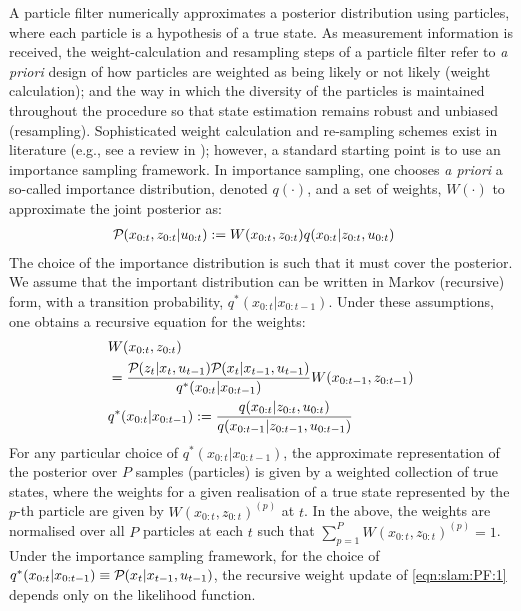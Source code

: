 A particle filter numerically approximates a posterior distribution using particles, where each particle is a hypothesis of a true state. As measurement information is received, the weight-calculation and resampling steps of a particle filter refer to \textit{a priori} design of how particles are weighted as being likely or not likely (weight calculation); and the way in which the diversity of the particles is maintained throughout the procedure so that state estimation remains robust and unbiased (resampling). Sophisticated weight calculation and re-sampling schemes exist in literature (e.g., see a review in \cite{li2015resampling}); however, a standard starting point is to use an importance sampling framework. In importance sampling, one chooses \textit{a priori} a so-called importance distribution, denoted $q(\cdot)$, and a set of weights, $W(\cdot)$ to approximate the joint posterior as:
\begin{align}
\mathcal{P}_{} ( x_{0:t} , z_{0:t} |u_{0:t} ) &:= W(x_{0:t} , z_{0:t}) q(x_{0:t} | z_{0:t}, u_{0:t}) \label{eqn:slam:PF:1}
\end{align} The choice of the importance distribution is such that it must cover the posterior. We assume that the important distribution can be written in Markov (recursive) form, with a transition probability, $q^*(x_{0:t} |x_{0:t-1})$. Under these assumptions, one obtains a recursive equation for the weights:
\begin{align}
& W(x_{0:t} , z_{0:t})  \nonumber \\
&= \frac{\mathcal{P}_{} ( z_{t} | x_{t}, u_{t-1} )  \mathcal{P}_{} ( x_{t}| x_{t-1}, u_{t-1}  )}{q^*(x_{0:t} |x_{0:t-1})} W(x_{0:t-1} , z_{0:t-1})  \label{eqn:slam:PF:2} \\
&q^*(x_{0:t} |x_{0:t-1}) := \frac{q(x_{0:t} | z_{0:t}, u_{0:t})}{q(x_{0:t-1} | z_{0:t-1}, u_{0:t-1})} \label{eqn:slam:PF:3}
\end{align} For any particular choice of $q^*(x_{0:t} |x_{0:t-1})$, the approximate representation of the posterior over $P$ samples  (particles) is given by a weighted collection of true states, where the weights for a given realisation of a true state represented by the $p$-th particle are given by  $W(x_{0:t} , z_{0:t})^{(p)}$ at $t$.  In the above, the weights are normalised over all $P$ particles at each $t$ such that $\sum_{p = 1}^{P} W(x_{0:t} , z_{0:t})^{(p)} = 1$. Under the importance sampling framework, for the choice of $q^*(x_{0:t} |x_{0:t-1}) \equiv \mathcal{P}_{} ( x_{t}| x_{t-1}, u_{t-1} )$, the recursive weight update of \cref{eqn:slam:PF:1} depends only on the likelihood function. 
